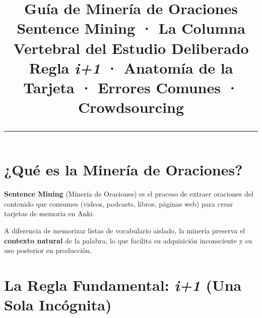 \documentclass[12pt,a4paper]{article}
\title{%
  \vspace{-1cm}
  {\Huge\bfseries\textcolor{mineria}{Guía de Minería de Oraciones}}\\[0.3cm]
  {\Large Sentence Mining · La Columna Vertebral del Estudio Deliberado}\\[0.2cm]
  {\large\color{grissuave} Regla \textit{i+1} · Anatomía de la Tarjeta · Errores Comunes · Crowdsourcing}\\[0.5cm]
  \rule{\textwidth}{1.5pt}
}
\author{}
\date{}
\begin{document}
\maketitle
\thispagestyle{empty}

\section{¿Qué es la Minería de Oraciones?}

\begin{cajaprincipio}[Definición]
\textbf{Sentence Mining} (Minería de Oraciones) es el proceso de extraer oraciones del contenido que consumes (videos, podcasts, libros, páginas web) para crear tarjetas de memoria en Anki.

\medskip
A diferencia de memorizar listas de vocabulario aislado, la minería preserva el \textbf{contexto natural} de la palabra, lo que facilita su adquisición inconsciente y su uso posterior en producción.
\end{cajaprincipio}

\section{La Regla Fundamental: \textit{i+1} (Una Sola Incógnita)}
\end{document}
